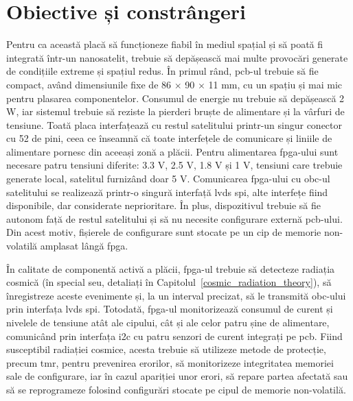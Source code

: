 \documentclass[12pt,a4paper]{report}
\begin{document}
\section{Obiective și constrângeri}
Pentru ca această placă să funcționeze fiabil în mediul spațial și să poată fi integrată într-un nanosatelit, trebuie să depășească mai multe provocări generate de condițiile extreme și spațiul redus. În primul rând, \gls{pcb}-ul trebuie să fie compact, având dimensiunile fixe de 86 $\times$ 90 $\times$ 11 mm, cu un spațiu și mai mic pentru plasarea componentelor. Consumul de energie nu trebuie să depășească 2 W, iar sistemul trebuie să reziste la pierderi bruște de alimentare și la vârfuri de tensiune. Toată placa interfațează cu restul satelitului printr-un singur conector cu 52 de pini, ceea ce înseamnă că toate interfețele de comunicare și liniile de alimentare pornesc din aceeași zonă a plăcii. Pentru alimentarea \gls{fpga}-ului sunt necesare patru tensiuni diferite: 3.3 V, 2.5 V, 1.8 V și 1 V, tensiuni care trebuie generate local, satelitul furnizând doar 5 V. Comunicarea \gls{fpga}-ului cu \gls{obc}-ul satelitului se realizează printr-o singură interfață \gls{lvds} \gls{spi}, alte interfețe fiind disponibile, dar considerate neprioritare. În plus, dispozitivul trebuie să fie autonom față de restul satelitului și să nu necesite configurare externă \gls{pcb}-ului. Din acest motiv, fișierele de configurare sunt stocate pe un cip de memorie non-volatilă amplasat lângă \gls{fpga}.

În calitate de componentă activă a plăcii, \gls{fpga}-ul trebuie să detecteze radiația cosmică (în special \gls{seu}, detaliați în Capitolul~\ref{cosmic_radiation_theory}), să înregistreze aceste evenimente și, la un interval precizat, să le transmită \gls{obc}-ului prin interfața \gls{lvds} \gls{spi}. Totodată, \gls{fpga}-ul monitorizează consumul de curent și nivelele de tensiune atât ale cipului, cât și ale celor patru șine de alimentare, comunicând prin interfața \gls{i2c} cu patru senzori de curent integrați pe \gls{pcb}. Fiind susceptibil radiației cosmice, acesta trebuie să utilizeze metode de protecție, precum \gls{tmr}, pentru prevenirea erorilor, să monitorizeze integritatea memoriei sale de configurare, iar în cazul apariției unor erori, să repare partea afectată sau să se reprogrameze folosind configurări stocate pe cipul de memorie non-volatilă.
\end{document}
